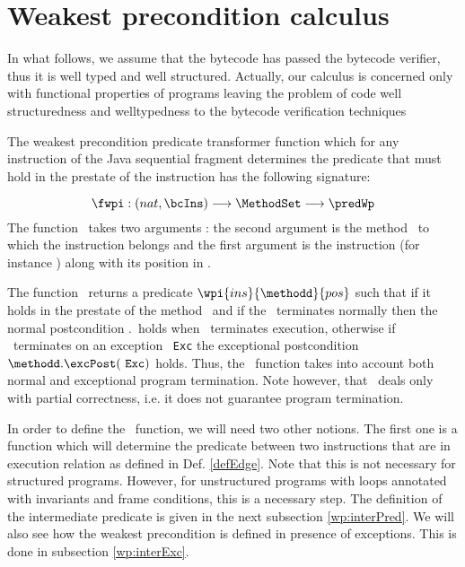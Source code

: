  






\section{Weakest precondition calculus} \label{wpRules}

In what follows, we assume that the bytecode has passed the bytecode verifier, thus it is well typed and well structured. Actually, our calculus is concerned only
with functional properties of programs leaving the problem of code well structuredness and welltypedness to the bytecode verification techniques 








The weakest precondition predicate transformer function which for any instruction of the Java sequential fragment
determines the predicate that must hold in the prestate of the instruction has the following signature:

$$ \fwpi :   (nat,\bcIns)  \longrightarrow   \MethodSet   \longrightarrow \predWp $$
The function \fwpi \ takes two arguments : 
the second argument is the method \methodd \ to which the  instruction belongs
and  the first argument is  the instruction (for instance  \putfield) along with its position in \methodd.

The function \fwpi \  returns a predicate $\wpi{ins}{\methodd}{pos}$ such that  if it holds in the prestate of the method \methodd \  and if the
\methodd \ terminates normally then the normal postcondition \methodd.\normalPost \ holds when  \methodd \ terminates execution, otherwise if \methodd \ terminates on an exception
  \mbox{ \rm \texttt{Exc}} the exceptional postcondition  $ \methodd.\excPost( \mbox{ \rm \texttt{Exc}} )$ holds. 
Thus, the \fwpi \ function takes into account both normal and exceptional program termination. Note however, that \fwpi \ deals only with partial correctness, i.e.
 it does not guarantee program termination.

In order to define the \fwpi \ function, we will need two other notions.
 The first one is a function which will determine the predicate between two instructions that are in execution relation as defined in Def. \ref{defEdge}. 
Note that this is not necessary for structured programs. However, for unstructured programs with loops annotated with invariants and frame conditions,
this is a necessary step.  The definition of the intermediate predicate is given in the next subsection \ref{wp:interPred}.
We will also see how the weakest precondition is defined in presence of exceptions. This is done in subsection \ref{wp:interExc}.

 





